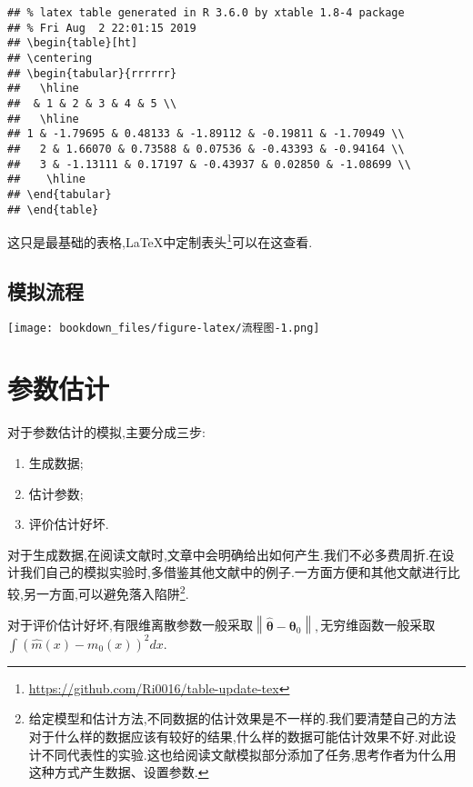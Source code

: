 \documentclass[]{ctexbook}
\providecommand{\tightlist}{%
  \setlength{\itemsep}{0pt}\setlength{\parskip}{0pt}}
\renewcommand{\href}[2]{#2\footnote{\url{#1}}}
\begin{document}
\begin{verbatim}
## % latex table generated in R 3.6.0 by xtable 1.8-4 package
## % Fri Aug  2 22:01:15 2019
## \begin{table}[ht]
## \centering
## \begin{tabular}{rrrrrr}
##   \hline
##  & 1 & 2 & 3 & 4 & 5 \\ 
##   \hline
## 1 & -1.79695 & 0.48133 & -1.89112 & -0.19811 & -1.70949 \\ 
##   2 & 1.66070 & 0.73588 & 0.07536 & -0.43393 & -0.94164 \\ 
##   3 & -1.13111 & 0.17197 & -0.43937 & 0.02850 & -1.08699 \\ 
##    \hline
## \end{tabular}
## \end{table}
\end{verbatim}

这只是最基础的表格,LaTeX中\href{https://github.com/Ri0016/table-update-tex}{定制表头}可以在这查看.

\hypertarget{section-8}{%
\section{模拟流程}\label{section-8}}

\texttt{[image: bookdown\_files/figure-latex/流程图-1.png]}

\hypertarget{section-9}{%
\chapter{参数估计}\label{section-9}}

对于参数估计的模拟,主要分成三步:

\begin{enumerate}
\def\labelenumi{\arabic{enumi}.}
\tightlist
\item
  生成数据;
\item
  估计参数;
\item
  评价估计好坏.
\end{enumerate}

对于生成数据,在阅读文献时,文章中会明确给出如何产生.我们不必多费周折.在设计我们自己的模拟实验时,多借鉴其他文献中的例子.一方面方便和其他文献进行比较,另一方面,可以避免落入陷阱\footnote{给定模型和估计方法,不同数据的估计效果是不一样的.我们要清楚自己的方法对于什么样的数据应该有较好的结果,什么样的数据可能估计效果不好.对此设计不同代表性的实验.这也给阅读文献模拟部分添加了任务,思考作者为什么用这种方式产生数据、设置参数.}.

对于评价估计好坏,有限维离散参数一般采取\(\left\|\hat{\boldsymbol{\theta}}-\boldsymbol{\theta}_{0}\right\|,\)无穷维函数一般采取\(\int\left(\hat{m}(x)-m_{0}(x)\right)^{2} d x.\)
\end{document}
